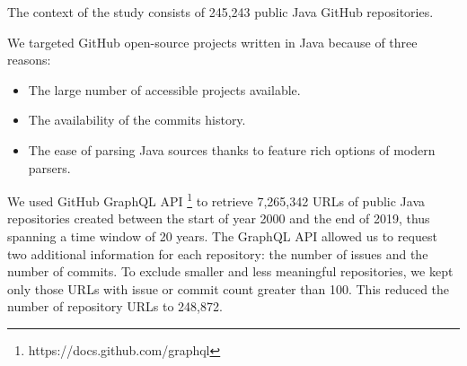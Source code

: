 

The context of the study consists of 245,243 public Java GitHub repositories. 

We targeted GitHub open-source projects written in Java because of three reasons:
\begin{itemize}
    \item The large number of accessible projects available.
    \item The availability of the commits history. 
    \item The ease of parsing Java sources thanks to feature rich options of modern parsers.
\end{itemize}
We used GitHub GraphQL API \footnote{https://docs.github.com/graphql} to retrieve 7,265,342 URLs of public Java repositories created between the start of year 2000 and the end of 2019, thus spanning a time window of 20 years.
The GraphQL API allowed us to request two additional information for each repository: the number of issues and the number of commits. To exclude smaller and less meaningful repositories, we kept only those URLs with issue or commit count greater than 100. This reduced the number of repository URLs to 248,872.

